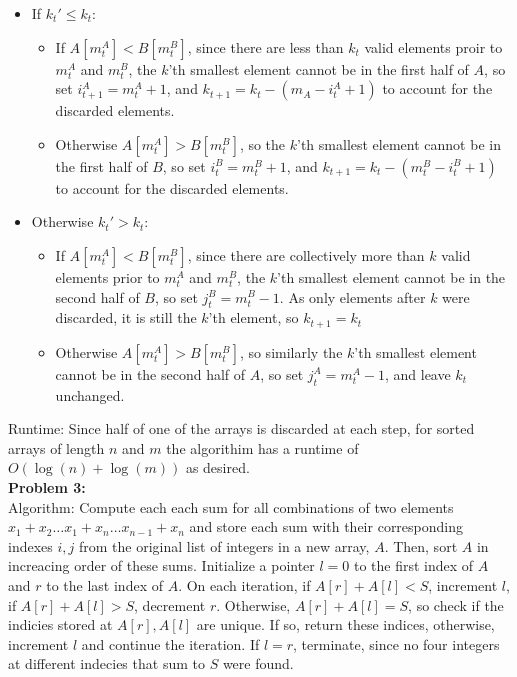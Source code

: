 \documentclass{article}
\begin{document}
\begin{itemize}
    \item If $k_t' \leq k_t$: 
    \begin{itemize}
        \item If $A[m^A_t] < B[m^B_t]$, since there are less than $k_t$ valid elements proir to $m^A_t$ and $m^B_t$, the $k$'th smallest element cannot be in the first half of $A$, so set $i^A_{t + 1} = m^A_t + 1$, and $k_{t + 1} = k_{t} - (m_A - i^A_t + 1)$ to account for the discarded elements. 
        \item Otherwise $A[m^A_t] > B[m^B_t]$, so the $k$'th smallest element cannot be in the first half of $B$, so set $i^B_t = m^B_t + 1$, and $k_{t + 1} = k_{t} - (m^B_t - i^B_t + 1)$ to account for the discarded elements. 
    \end{itemize}
    \item Otherwise  $k_t' > k_t$: 
    \begin{itemize}
        \item If $A[m^A_t] < B[m^B_t]$, since there are collectively more than $k$ valid elements prior to $m^A_t$ and $m^B_t$, the $k$'th smallest element cannot be in the second half of $B$, so set $j^B_t = m^B_t - 1$. As only elements after $k$ were discarded, it is still the $k$'th element, so $k_{t + 1} = k_t$
        \item Otherwise $A[m^A_t] > B[m^B_t]$, so similarly the $k$'th smallest element cannot be in the second half of $A$, so set $j^A_t = m^A_t - 1$, and leave $k_t$ unchanged.
    \end{itemize}
\end{itemize}
Runtime: Since half of one of the arrays is discarded at each step, for sorted arrays of length $n$ and $m$ the algorithim has a runtime of $O(\log(n) + \log(m))$ as desired. \\[1.0ex]
\newpage
\textbf{Problem 3:} \\[0.5ex]
Algorithm: Compute each each sum for all combinations of two elements $x_1 +  x_2 \dots x_1 +  x_n \dots x_{n - 1} + x_n$ and store each sum with their corresponding indexes $i, j$ from the original list of integers in a new array, $A$. Then, sort $A$ in increacing order of these sums. Initialize a pointer $l = 0$ to the first index of $A$ and $r$ to the last index of $A$. On each iteration, if $A[r] + A[l] < S$, increment $l$, if $A[r] + A[l] > S$, decrement $r$. Otherwise, $A[r] + A[l] = S$, so check if the indicies stored at $A[r], A[l]$ are unique. If so, return these indices, otherwise, increment $l$ and continue the iteration. If $l = r$, terminate, since no four integers at different indecies that sum to $S$ were found. \\[0.5ex]
\end{document}
